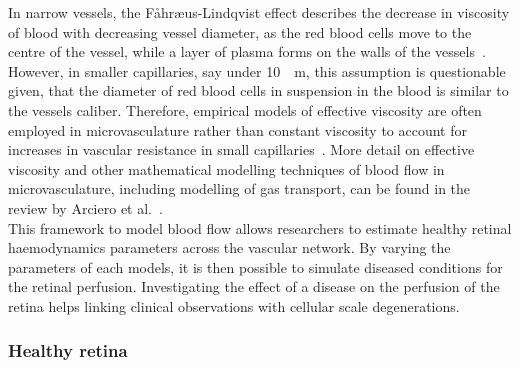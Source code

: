 \documentclass[12pt,a4paper]{journal}
\begin{document}
In narrow vessels, the F\r{a}hr\ae us-Lindqvist effect describes the decrease in viscosity of blood with decreasing vessel diameter, as the red blood cells move to the centre of the vessel, while a layer of plasma forms on the walls of the vessels~\cite{F_hr_us_1931}.
However, in smaller capillaries, say under \SI{10}{\mu\meter}, this assumption is questionable given, that the diameter of red blood cells in suspension in the blood is similar to the vessels caliber.
Therefore, empirical models of effective viscosity are often employed in microvasculature rather than constant viscosity to account for increases in vascular resistance in small capillaries~\cite{Pries_1990, Haynes_1960}.
More detail on effective viscosity and other mathematical modelling techniques of blood flow in microvasculature, including modelling of gas transport, can be found in the review by Arciero et al.~\cite{C_Arciero_2017}. \\
This framework to model blood flow allows researchers to estimate healthy retinal haemodynamics parameters across the vascular network.
By varying the parameters of each models, it is then possible to simulate diseased conditions for the retinal perfusion.
Investigating the effect of a disease on the perfusion of the retina helps linking clinical observations with cellular scale degenerations.


\subsubsection{Healthy retina}
\end{document}
